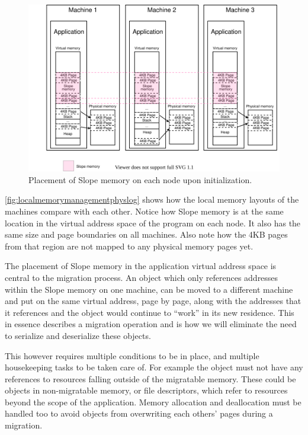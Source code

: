 \begin{figure}[t]
\centering
{}
\includegraphics[width=1\textwidth]{local-memory-management-phys-log.drawio}
\caption{
    Placement of Slope memory on each node upon initialization.
}
\label{fig:localmemorymanagementphyslog}
\end{figure}

\autoref{fig:localmemorymanagementphyslog} shows how the local memory layouts
of the machines compare with each other. Notice how Slope memory is at the
same location in the virtual address space of the program on each node.
It also has the same size and page boundaries on all machines. Also note how
the 4KB pages from that region are not mapped to any physical memory pages
yet.

The placement of Slope memory in the application virtual address space is
central to the migration process. An object which only references addresses
within the Slope memory on one machine, can be moved to a different machine
and put on the same virtual address, page by page, along with the addresses
that it references and the object would continue to ``work'' in its new
residence. This in essence describes a migration operation and is how we will
eliminate the need to serialize and deserialize these objects.

This however requires multiple conditions to be in place, and multiple
housekeeping tasks to be taken care of. For example the object must not have
any references to resources falling outside of the migratable memory. These
could be objects in non-migratable memory, or file descriptors, which refer
to resources beyond the scope of the application. Memory allocation
and deallocation must be handled too to avoid objects from overwriting each
others' pages during a migration.

